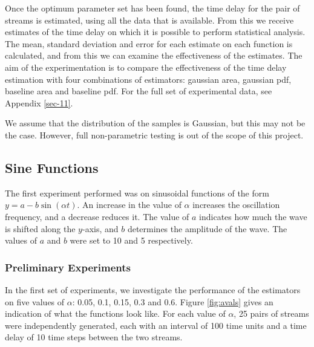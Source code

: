 \documentclass[a4paper,11pt]{article}
\begin{document}
  Once the optimum parameter set has been found, the time delay
  for the pair of streams is estimated, using all the data that is available. From
  this we receive estimates of the time delay on which it is possible to perform
  statistical analysis. The mean, standard deviation and error for each estimate
  on each function is calculated, and from this we can examine the effectiveness
  of the estimates. The aim of the experimentation is to compare the effectiveness
  of the time delay estimation with four combinations of estimators: gaussian
  area, gaussian pdf, baseline area and baseline pdf. For the full set of
  experimental data, see Appendix \ref{sec-11}.

  We assume that the distribution of the samples is Gaussian, but this may not be
  the case. However, full non-parametric testing is out of the scope of this project.
\subsection{Sine Functions}
\label{sec-8-1}

   The first experiment performed was on sinusoidal functions of the form
   $y=a-b\sin(\alpha t)$. An increase in the value of $\alpha$ increases the
   oscillation frequency, and a decrease reduces it. The value of $a$ indicates how
   much the wave is shifted along the $y$-axis, and $b$ determines the
   amplitude of the wave. The values of $a$ and $b$ were set to 10 and 5 respectively.
\subsubsection{Preliminary Experiments}
\label{sec-8-1-1}

    In the first set of experiments, we investigate the performance of the
    estimators on five values of $\alpha$: 0.05, 0.1, 0.15, 0.3 and 0.6. Figure
    \ref{fig:avals} gives an indication of what the functions look like. For
    each value of $\alpha$, 25 pairs of streams were independently generated, each
    with an interval of 100 time units and a time delay of 10 time steps between the
    two streams. 
\end{document}
